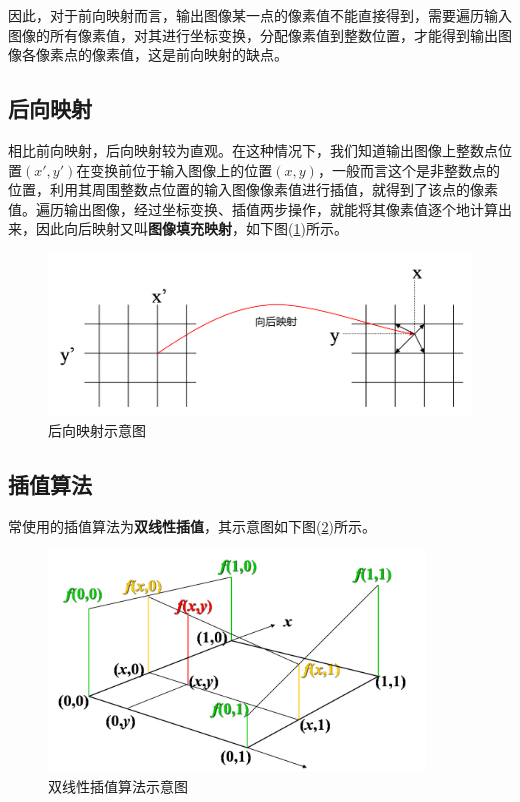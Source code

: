 \documentclass[UTF-8, a4paper, 12pt]{ctexart}
\begin{document}
因此，对于前向映射而言，输出图像某一点的像素值不能直接得到，需要遍历输入图像的所有像素值，对其进行坐标变换，分配像素值到整数位置，才能得到输出图像各像素点的像素值，这是前向映射的缺点。

\subsection{后向映射}

相比前向映射，后向映射较为直观。在这种情况下，我们知道输出图像上整数点位置$(x',y')$在变换前位于输入图像上的位置$(x,y)$，一般而言这个是非整数点的位置，利用其周围整数点位置的输入图像像素值进行插值，就得到了该点的像素值。遍历输出图像，经过坐标变换、插值两步操作，就能将其像素值逐个地计算出来，因此向后映射又叫{\bfseries 图像填充映射}，如下图(\ref{f2})所示。
\begin{figure}[htbp]
    \centering
    \includegraphics[width=13cm]{fig/f2.jpg}
    \caption{后向映射示意图}
    \label{f2}
\end{figure}

\subsection{插值算法}

常使用的插值算法为{\bfseries 双线性插值}，其示意图如下图(\ref{f3})所示。
\begin{figure}[htbp]
    \centering
    \includegraphics[width=10cm]{fig/f3.jpg}
    \caption{双线性插值算法示意图}
    \label{f3}
\end{figure}
\end{document}
